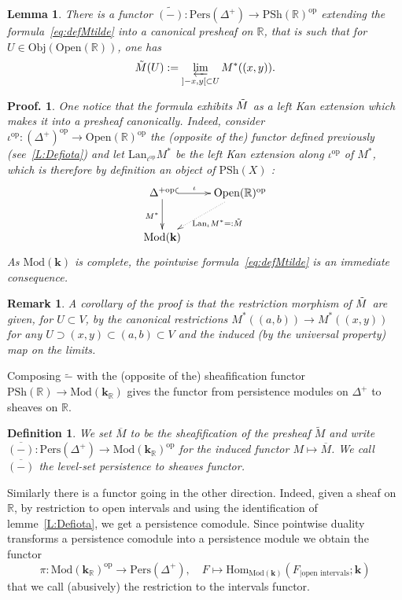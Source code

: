 \documentclass[a4paper, english, 11pt]{article}
\newcommand{\kk}[0]{\textbf{k}}
\newcommand{\Mod}[0]{\text{Mod}}
\newcommand{\Pe}{\text{Pers}}
\newcommand{\0}{\vec{0}}
\newcommand{\R}[0]{\mathbb{R}}
\newcommand{\Obj}[0]{\text{Obj}}
\newcommand{\Ouv}[0]{\mathrm{Open}}
\newcommand{\op}[0]{\text{op}}
\newcommand{\Hom}[0]{\text{Hom}}
\newtheorem*{pf}{Proof.} }
\newtheorem{remark}[prop]{Remark}
\newtheorem{lem}[prop]{Lemma}
\newtheorem{defi}[prop]{Definition}
\begin{document}
\begin{lem} There is a functor $\tilde{(-)}: \Pe(\Delta^+)\to \text{PSh}(\R)^{\op}$   extending the formula~\eqref{eq:defMtilde} into a canonical presheaf on $\R$, that is such that for   $U \in \Obj(\Ouv(\R))$, one has $$\Tilde{M} (U):=  \varprojlim_{]-x,y[\subset U} M^*((x,y)).$$ 
\end{lem}
\begin{pf} One notice that the formula exhibits  $\Tilde{M}$ as a  left Kan extension which makes it into a presheaf canonically. Indeed, 
 consider $\iota^\text{op} : (\Delta^{+})^{\op}\longrightarrow \Ouv(\R)^{\op}$ the (opposite of the) functor defined previously (see~\ref{L:Defiota}) and let  $\text{Lan}_{\iota^\text{op}} M^*$  be the left Kan extension along $\iota^\text{op}$ of $M^*$, which is therefore by definition an object of $\text{PSh}(X)$ : 
$$\xymatrix{ \Delta^{+\text{op}}
\ar@{^{(}->}[r]^-{\iota} \ar[d]_{M^*} & \Ouv(\R)^\text{op} \ar@{.>}[dl]^{\text{Lan}_\iota M^* =: \Tilde{M}} \\
\Mod(\kk) & } $$
As $\Mod(\kk)$ is complete,  the pointwise formula~\eqref{eq:defMtilde} is an immediate consequence.  
\end{pf}
\begin{remark}
 A corollary of the proof is that the restriction morphism of $\Tilde{M}$ are given, for $U\subset V$, by the canonical restrictions $M^*((a,b)) \to M^*((x,y))$ for any $ U\supset (x,y) \subset (a,b)\subset V$ and the induced (by the universal property) map on the limits. 
\end{remark}
Composing $\tilde{-}$ with the (opposite of the) sheafification functor $ \text{PSh}(\R) \to \Mod(\kk_{\R})$ gives the functor from persistence modules on $\Delta^{+}$ to sheaves on $\R$. 
\begin{defi}\label{D:defofBar}
We set $\overline{M}$ to be the sheafification of the presheaf $\tilde{M}$ and write 
$\overline{(-)} : \Pe(\Delta^+)\longrightarrow \Mod (\kk_\R)^{\op}$ for the induced functor $M\mapsto \overline{M}$. We call $\overline{(-)}$ the level-set persistence to sheaves functor. 
\end{defi}
Similarly there is a functor going in the other direction. Indeed, given a sheaf on $\R$, by restriction to open intervals and using the identification of lemme~\ref{L:Defiota}, we get a persistence comodule. Since pointwise duality transforms a persistence comodule into a persistence module we obtain the functor 
\begin{equation}
 \label{eq:defpi}  \pi : \Mod(\kk_\R)^{\op} \longrightarrow \Pe(\Delta^+), \quad F\mapsto \Hom_{\Mod(\kk)}(F_{ | \text{open intervals}};\kk)
\end{equation}
that we call (abusively) the restriction to the intervals functor.
\end{document}
